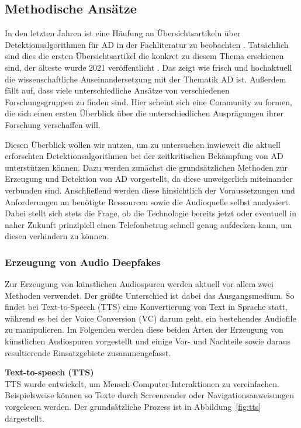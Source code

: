 \subsection{Methodische Ansätze}
In den letzten Jahren ist eine Häufung an Übersichtsartikeln über Detektionsalgorithmen für AD in der Fachliteratur zu beobachten \citep[][]{Masood2022,Almutairi2022,Khanjani2021}.
Tatsächlich sind dies die ersten Übersichtsartikel die konkret zu diesem Thema erschienen sind, der älteste wurde 2021 veröffentlicht \citep[][]{Khanjani2021}.
Das zeigt wie frisch und hochaktuell die wissenschaftliche Auseinandersetzung mit der Thematik AD ist.
Außerdem fällt auf, dass viele unterschiedliche Ansätze von verschiedenen Forschungsgruppen zu finden sind.
Hier scheint sich eine Community zu formen, die sich einen ersten Überblick über die unterschiedlichen Ausprägungen ihrer Forschung verschaffen will.

Diesen Überblick wollen wir nutzen, um zu untersuchen inwieweit die aktuell erforschten Detektionsalgorithmen bei der zeitkritischen Bekämpfung von AD unterstützen können.
Dazu werden zunächst die grundsätzlichen Methoden zur Erzeugung und Detektion von AD vorgestellt, da diese unweigerlich miteinander verbunden sind.
Anschließend werden diese hinsichtlich der Voraussetzungen und Anforderungen an benötigte Ressourcen sowie die Audioquelle selbst analysiert.
Dabei stellt sich stets die Frage, ob die Technologie bereits jetzt oder eventuell in naher Zukunft prinzipiell einen Telefonbetrug schnell genug aufdecken kann, um diesen verhindern zu können.

\subsubsection{Erzeugung von Audio Deepfakes}
Zur Erzeugung von künstlichen Audiospuren werden aktuell vor allem zwei Methoden verwendet.
Der größte Unterschied ist dabei das Ausgangsmedium.
So findet bei Text-to-Speech (TTS) eine Konvertierung von Text in Sprache statt, während es bei der Voice Conversion (VC) darum geht, ein bestehendes Audiofile zu manipulieren.
Im Folgenden werden diese beiden Arten der Erzeugung von künstlichen Audiospuren vorgestellt und einige Vor- und Nachteile sowie daraus resultierende Einsatzgebiete zusammengefasst.
\clearpage

\textbf{Text-to-speech (TTS)}\\
TTS wurde entwickelt, um Mensch-Computer-Interaktionen zu vereinfachen.
Beispielsweise können so Texte durch Screenreader oder Navigationsanweisungen vorgelesen werden.
Der grundsätzliche Prozess ist in Abbildung~\ref{fig:tts} \citep[][]{Masood2022} dargestellt.

